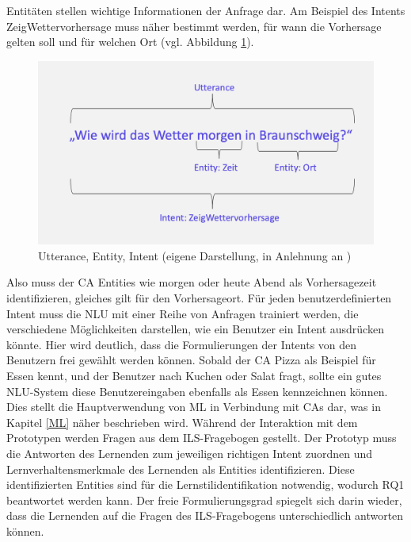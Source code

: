         Entitäten stellen wichtige Informationen der Anfrage dar.
        Am Beispiel des Intents \glqq ZeigWettervorhersage\grqq{} muss näher bestimmt werden, für wann die Vorhersage 
        gelten soll und für welchen Ort (vgl. Abbildung \ref{fig:Utterance}). \parencite[138 f.]{Sieber.2019}
        \begin{figure}[H]
            \centering
            \includegraphics[width=0.6\linewidth]{images/utterance.png}
            \caption[Utterance, Entity, Intent]{Utterance, Entity, Intent (eigene Darstellung, in Anlehnung an \parencite[139]{Sieber.2019})}
            \label{fig:Utterance}
        \end{figure}
        
        Also muss der CA Entities wie \glqq morgen\grqq{}  oder \glqq heute Abend\grqq{} als Vorhersagezeit
        identifizieren, gleiches gilt für den Vorhersageort. 
        Für jeden benutzerdefinierten Intent muss die NLU mit einer Reihe von Anfragen trainiert
        werden, die verschiedene Möglichkeiten darstellen, wie ein Benutzer ein Intent ausdrücken könnte. \parencite[2]{Ahmad.2021}\parencite[138 f.]{Sieber.2019}
        Hier wird deutlich, dass die Formulierungen der Intents von den Benutzern frei gewählt werden können.
        Sobald der CA Pizza als Beispiel für Essen kennt, und der Benutzer nach Kuchen oder Salat fragt, sollte ein gutes NLU-System diese Benutzereingaben
        ebenfalls als Essen kennzeichnen können. \parencite[21]{Kong.2021}
        Dies stellt die Hauptverwendung von ML in Verbindung mit CAs dar, was in Kapitel \ref{ML} näher beschrieben wird.
        Während der Interaktion mit dem Prototypen werden Fragen aus dem ILS-Fragebogen gestellt.
        Der Prototyp muss die Antworten des Lernenden zum jeweiligen richtigen Intent zuordnen und
        Lernverhaltensmerkmale des Lernenden als Entities identifizieren. Diese 
        identifizierten Entities sind für die Lernstilidentifikation
        notwendig, wodurch RQ1 beantwortet werden kann. Der freie Formulierungsgrad spiegelt sich 
        darin wieder, dass die Lernenden auf die Fragen des ILS-Fragebogens unterschiedlich antworten können.

